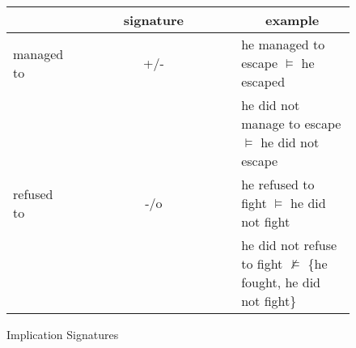 \begin{figure}
\begin{center}
  \begin{tabular}{l c l}
    \hline
   	 & ~~~~~~signature~~~~~~ &  \multicolumn{1}{c}{example} \\
   	\hline
   	managed to       & +/- & he managed to escape $\vDash$ he escaped \\
   	                 &     & he did not manage to escape $\vDash$ he did not escape \\
   	\hline
   	refused to       & -/o & he refused to fight $\vDash$ he did not fight \\
   	                 &     & he did not refuse to fight $\nvDash$ \{he fought, he did not fight\} \\
   	\hline
  \end{tabular}
\end{center}
\caption{Implication Signatures}
\label{fig:imp-sig}
\end{figure}

